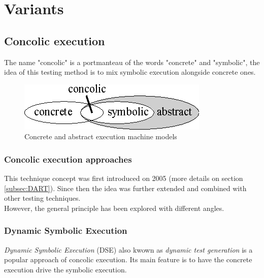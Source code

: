 \documentclass[11pt]{article}
\begin{document}
  \section{Variants}
    \subsection{Concolic execution}
    \label{subsec:concolicExecution}
    	The name "concolic" is a portmanteau of the words "concrete" and "symbolic", the idea of this testing method is to mix symbolic execution alongside concrete ones.\\

    	\begin{figure}
    		\centering
    		\includegraphics[width=0.34\columnwidth]{concrete-abstract.eps}
			\caption{Concrete and abstract execution machine models}
			\label{fig:concrete-symbolic}
    	\end{figure}

    	\subsubsection*{Concolic execution approaches}
    		This technique concept was first introduced on 2005 \cite{godefroid2005dart} (more details on section \ref{subsec:DART}). %
    	Since then the idea was further extended and combined with other testing techniques.\\

    	However, the general principle has been explored with different angles.

    		\subsubsection{Dynamic Symbolic Execution}
    		\label{subsec:dynamicSymbolicExec}
    			\emph{Dynamic Symbolic Execution} (DSE) also kwown as \emph{dynamic test generation} \cite{godefroid2005dart} is a popular approach of concolic execution. Its main feature is to have the concrete execution drive the symbolic execution.\\
\end{document}
